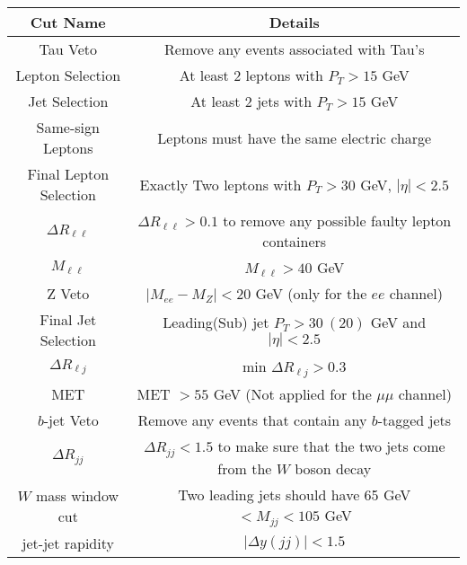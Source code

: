 
\begin{tabular}{|c||c|}
	\hline
      Cut Name & Details \\
      \hline
      \hline
      Tau Veto & Remove any events associated with Tau's \\
      \hline
      Lepton Selection & At least 2 leptons with $P_T> 15$ GeV  \\
      \hline
      Jet Selection & At least 2 jets with $P_T> 15$ GeV \\
      \hline
      Same-sign Leptons & Leptons must have the same electric charge \\
      \hline
      Final Lepton Selection & Exactly Two leptons with $P_T > 30$ GeV, $|\eta|<2.5$ \\
      \hline
      $\Delta R_{\ell \ell}$ & $\Delta R_{\ell \ell} > 0.1$ to remove any possible faulty lepton containers \\
      \hline
      $M_{\ell \ell}$ & $M_{\ell \ell} > 40$ GeV \\
      \hline
      Z Veto & $ | M_{ee} - M_Z | < 20$ GeV (only for the $ee$ channel) \\
      \hline
      Final Jet Selection & Leading(Sub) jet $P_T> 30~(20)$ GeV and $|\eta| < 2.5$ \\
      \hline
      $\Delta R_{\ell j}$ & min $\Delta R_{\ell j} > 0.3$ \\
      \hline
      MET & MET $ > 55$ GeV (Not applied for the $\mu\mu$ channel) \\
      \hline
      $b$-jet Veto & Remove any events that contain any $b$-tagged jets \\
      \hline
      $\Delta R_{jj}$ & $\Delta R_{j j} < 1.5$ to make sure that the two jets come from the $W$ boson decay \\ 
      \hline
      $W$ mass window cut & Two leading jets should have 65 GeV $<M_{jj}<105$ GeV  \\
      \hline
      jet-jet rapidity & $|\Delta y(jj)| < 1.5$ \\
      \hline

\end{tabular}


